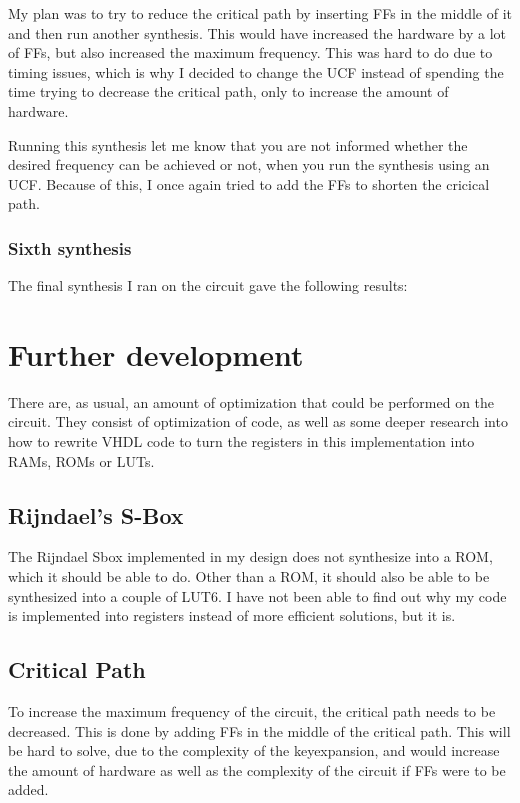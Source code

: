 My plan was to try to reduce the critical path by inserting FFs in the 
middle of it and then run another synthesis. This would have increased 
the hardware by a lot of FFs, but also increased the maximum frequency. 
This was hard to do due to timing issues, which is why I decided to 
change the UCF instead of spending the time trying to decrease the 
critical path, only to increase the amount of hardware.

Running this synthesis let me know that you are not informed whether the
desired frequency can be achieved or not, when you run the synthesis 
using an UCF. Because of this, I once again tried to add the FFs to 
shorten the cricical path. 

\subsubsection{Sixth synthesis}
The final synthesis I ran on the circuit gave the following results:

\section{Further development}
There are, as usual, an amount of optimization that could be performed 
on the circuit. They consist of optimization of code, as well as some 
deeper research into how to rewrite VHDL code to turn the registers in 
this implementation into RAMs, ROMs or LUTs.

\subsection{Rijndael's S-Box}
The Rijndael Sbox implemented in my design does not synthesize into a 
ROM, which it should be able to do. Other than a ROM, it should also be 
able to be synthesized into a couple of LUT6.
I have not been able to find out why my code is implemented into 
registers instead of more efficient solutions, but it is. 

\subsection{Critical Path}
To increase the maximum frequency of the circuit, the critical path 
needs to be decreased. This is done by adding FFs in the middle of the 
critical path. This will be hard to solve, due to the complexity of the 
keyexpansion, and would increase the amount of hardware as well as the 
complexity of the circuit if FFs were to be added.


